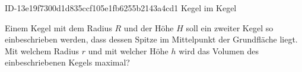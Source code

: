 \begin{exercise}
      {ID-13e19f7300d1d835ccf105e1fb6255b2143a4cd1}
      {Kegel im Kegel}
  \ifproblem\problem\par
    Einem Kegel mit dem Radius $R$ und der Höhe $H$ soll ein zweiter Kegel so
    einbeschrieben werden, dass dessen Spitze im Mittelpunkt der Grundfläche
    liegt. Mit welchem Radius $r$ und mit welcher Höhe $h$ wird das Volumen des
    einbeschriebenen Kegels maximal?
  \fi
\end{exercise}
